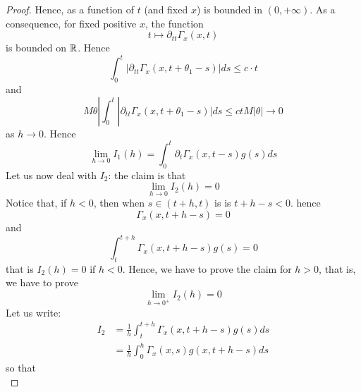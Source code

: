 \begin{itemize}
\begin{ProofBox}
\begin{proof}
            Hence, as a function of $t$ (and fixed $x$) is bounded in $(0,+\infty)$. 
            As a consequence, for fixed positive $x$, the function 
            \begin{equation}
                t \mapsto \partial_{tt}\Gamma_x(x,t)
            \end{equation}
            is bounded on $\mathbb{R}$. Hence
            \begin{equation*}
                \int_0^t |\partial_{tt}\Gamma_x(x,t+\theta_1-s)|ds \leq c \cdot t 
            \end{equation*}
            and
            \begin{equation*}
                M \theta| \int_0^t |\partial_{tt}\Gamma_x(x,t+\theta_1 - s)| ds \leq c t M |\theta| \rightarrow 0
            \end{equation*}
            as $h \rightarrow 0$. Hence
            \begin{equation*}
                \lim_{h \rightarrow 0} I_1(h) = \int_0^t \partial_t \Gamma_x(x,t-s) g(s) ds 
            \end{equation*}
            Let us now deal with $I_2$: the claim is that 
            \begin{equation*}
                \lim_{h \rightarrow 0} I_2(h) = 0
            \end{equation*}
            Notice that, if $h < 0$, then when $s \in (t+h,t)$ is is $t+h-s < 0$. hence 
            \begin{equation*}
                \Gamma_x(x,t+h-s) = 0
            \end{equation*}
            and 
            \begin{equation*}
                \int_t^{t+h} \Gamma_x(x,t+h-s) g(s) = 0
            \end{equation*}
            that is $I_2(h) = 0$ if $h < 0$.
            Hence, we have to prove the claim for $h > 0$, that is, we have to prove
            \begin{equation*}
                \lim_{h \rightarrow 0^+} I_2(h) = 0
            \end{equation*}
            Let us write:
            \begin{align*}
                I_2 &= \frac{1}{h} \int_t^{t+h} \Gamma_x(x,t+h-s)g(s) ds \\
                &= \frac{1}{h} \int_0^h \Gamma_x(x,s) g(x,t+h-s) ds
            \end{align*}
            so that 
            \begin{equation*}

\end{equation*}
\end{proof}
\end{ProofBox}
\end{itemize}
